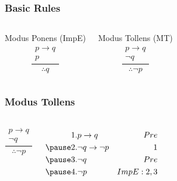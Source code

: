 \documentclass[dvipsnames]{beamer}
\begin{document}
\begin{frame}
  \frametitle{Basic Rules}

  \begin{columns}[t]
    \begin{block}{Modus Ponens (ImpE)}
      \[
      \frac
        {
          \begin{array}{c}
            p \rightarrow q\\
            p
          \end{array}
        }
        {
          \therefore q
        }
      \]
    \end{block}

    \pause
    \begin{block}{Modus Tollens (MT)}
      \[
      \frac
        {
          \begin{array}{c}
            p \rightarrow q\\
            \neg q
          \end{array}
        }
        {
          \therefore \neg p
        }
      \]
    \end{block}
  \end{columns}
\end{frame}

\begin{frame}
  \frametitle{Modus Tollens}

  \begin{example}
    \begin{columns}
      \[
      \frac
        {
          \begin{array}{c}
            p \rightarrow q\\
            \neg q
          \end{array}
        }
        {
          \therefore \neg p
        }
      \]

      \pause
      \begin{eqnarray*}
        1. & p \rightarrow q           & Pre\\
        \pause
        2. & \neg q \rightarrow \neg p & 1\\
        \pause
        3. & \neg q                    & Pre\\
        \pause
        4. & \neg p                    & ImpE:2,3\\
      \end{eqnarray*}
    \end{columns}
  \end{example}
\end{frame}
\end{document}
